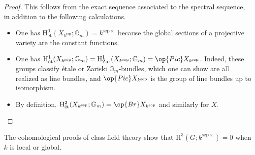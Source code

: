 \documentclass[../notes.tex]{subfiles}
\begin{document}
\begin{proof}
	This follows from the exact sequence associated to the spectral sequence, in addition to the following calculations.
	\begin{itemize}
		\item One has $\mathrm H^0_{\mathrm{\acute et}}(X_{k^{\mathrm{sep}}};\mathbb G_m)=k^{\mathrm{sep}\times}$ because the global sections of a projective variety are the constant functions.
		\item One has $\mathrm H^1_{\mathrm{\acute et}}(X_{k^{\mathrm{sep}}};\mathbb G_m)=\mathrm H^1_{\mathrm{Zar}}(X_{k^{\mathrm{sep}}};\mathbb G_m)=\op{Pic}X_{k^{\mathrm{sep}}}$. Indeed, these groups classify \'etale or Zariski $\mathbb G_m$-bundles, which one can show are all realized as line bundles, and $\op{Pic}X_{k^{\mathrm{sep}}}$ is the group of line bundles up to isomorphism.
		\item By definition, $\mathrm H^2_{\mathrm{\acute et}}(X_{k^{\mathrm{sep}}};\mathbb G_m)=\op{Br}X_{k^{\mathrm{sep}}}$ and similarly for $X$.
		\qedhere
	\end{itemize}
\end{proof}
\begin{remark}
	The cohomological proofs of class field theory show that $\mathrm H^3(G;k^{\mathrm{sep}\times})=0$ when $k$ is local or global.
\end{remark}
\end{document}
